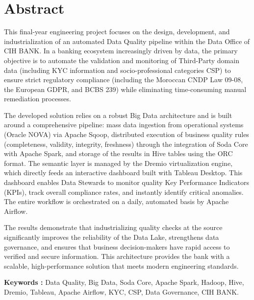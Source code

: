 \chapter*{Abstract}

This final-year engineering project focuses on the design, development, and industrialization of an automated Data Quality pipeline within the Data Office of CIH BANK. In a banking ecosystem increasingly driven by data, the primary objective is to automate the validation and monitoring of Third-Party domain data (including KYC information and socio-professional categories CSP) to ensure strict regulatory compliance (including the Moroccan CNDP Law 09-08, the European GDPR, and BCBS 239) while eliminating time-consuming manual remediation processes.

The developed solution relies on a robust Big Data architecture and is built around a comprehensive pipeline: mass data ingestion from operational systems (Oracle NOVA) via Apache Sqoop, distributed execution of business quality rules (completeness, validity, integrity, freshness) through the integration of Soda Core with Apache Spark, and storage of the results in Hive tables using the ORC format. The semantic layer is managed by the Dremio virtualization engine, which directly feeds an interactive dashboard built with Tableau Desktop. This dashboard enables Data Stewards to monitor quality Key Performance Indicators (KPIs), track overall compliance rates, and instantly identify critical anomalies. The entire workflow is orchestrated on a daily, automated basis by Apache Airflow.

The results demonstrate that industrializing quality checks at the source significantly improves the reliability of the Data Lake, strengthens data governance, and ensures that business decision-makers have rapid access to verified and secure information. This architecture provides the bank with a scalable, high-performance solution that meets modern engineering standards.

\vspace{1cm}
\noindent\textbf{Keywords :} Data Quality, Big Data, Soda Core, Apache Spark, Hadoop, Hive, Dremio, Tableau, Apache Airflow, KYC, CSP, Data Governance, CIH BANK.
